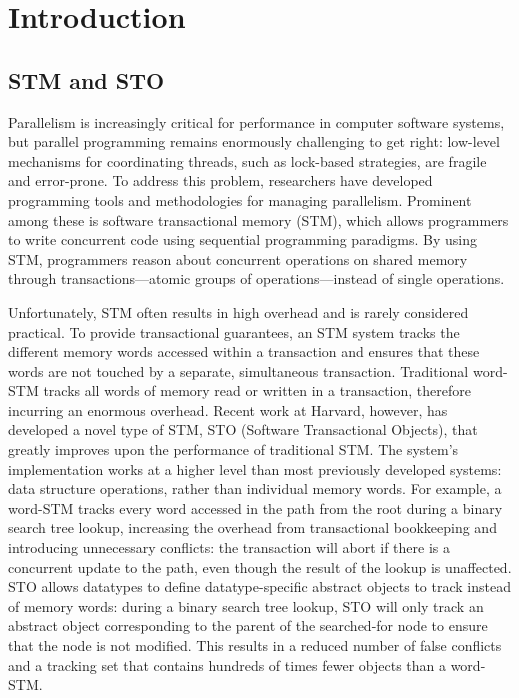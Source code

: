 \chapter{Introduction}
\section{STM and STO}
Parallelism is increasingly critical for performance in computer software systems, but parallel programming remains enormously challenging to get right: low-level mechanisms for coordinating threads, such as lock-based strategies, are fragile and error-prone. To address this problem, researchers have developed programming tools and methodologies for managing parallelism. Prominent among these is software transactional memory (STM), which allows programmers to write concurrent code using sequential programming paradigms. By using STM, programmers reason about concurrent operations on shared memory through transactions---atomic groups of operations---instead of single operations. 

Unfortunately, STM often results in high overhead and is rarely considered practical. To provide transactional guarantees, an STM system tracks the different memory words accessed within a transaction and ensures that these words are not touched by a separate, simultaneous transaction. Traditional word-STM tracks all words of memory read or written in a transaction, therefore incurring an enormous overhead\cite{cascaval}. Recent work at Harvard, however, has developed a novel type of STM, STO (Software Transactional Objects), that greatly improves upon the performance of traditional STM\cite{sto}. The system's implementation works at a higher level than most previously developed systems: data structure operations, rather than individual memory words. For example, a word-STM tracks every word accessed in the path from the root during a binary search tree lookup, increasing the overhead from transactional bookkeeping and introducing unnecessary conflicts: the transaction will abort if there is a concurrent update to the path, even though the result of the lookup is unaffected. STO allows datatypes to define datatype-specific abstract objects to track instead of memory words: during a binary search tree lookup, STO will only track an abstract object corresponding to the parent of the searched-for node to ensure that the node is not modified. This results in a reduced number of false conflicts and a tracking set that contains hundreds of times fewer objects than a word-STM. 

